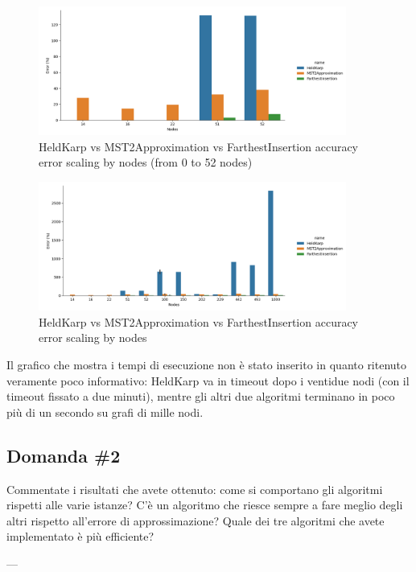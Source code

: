 \begin{figure}[H]
    \centering

    \includegraphics[width=0.9\textwidth]{./images/HeldKarp_vs_MST2Approximation_vs_FarthestInsertion_(approximation_error,_limited_to_52_nodes).png}

    \caption{HeldKarp vs MST2Approximation vs FarthestInsertion accuracy error scaling by nodes (from 0 to 52 nodes)}
    \label{fig:heldkarp-mst2approx-farthestinsertion-accuracy-error-52-nodes}
\end{figure}

\begin{figure}[H]
    \centering

    \includegraphics[width=0.9\textwidth]{./images/HeldKarp_vs_MST2Approximation_vs_FarthestInsertion_(approximation_error).png}

    \caption{HeldKarp vs MST2Approximation vs FarthestInsertion accuracy error scaling by nodes}
    \label{fig:heldkarp-mst2approx-farthestinsertion-accuracy-error}
\end{figure}

Il grafico che mostra i tempi di esecuzione non è stato inserito
in quanto ritenuto veramente poco informativo: HeldKarp va in 
timeout dopo i ventidue nodi (con il timeout fissato a due minuti),
mentre gli altri due algoritmi terminano in poco più di un secondo
su grafi di mille nodi. 

\subsection{Domanda \#2}

\begin{displayquote}
Commentate i risultati che avete ottenuto: come si comportano gli
algoritmi rispetti alle varie istanze? C'è un algoritmo che riesce
sempre a fare meglio degli altri rispetto all'errore di 
approssimazione? Quale dei tre algoritmi che avete implementato è
più efficiente?
\end{displayquote}


\noindent ---\\
